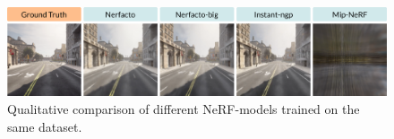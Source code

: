 \begin{figure}[ht]
    \centering
    \includegraphics[width=1.0\textwidth]{figures/different-models.png}
    \caption[Qualitative comparison of different NeRF-models]{Qualitative comparison of different NeRF-models trained on the same dataset.}
    \label{fig:different-models}
\end{figure}